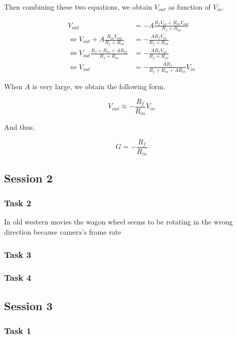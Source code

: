 \documentclass[12pt]{article}
\begin{document}
Then combining these two equations, we obtain $V_{out}$ as function of $V_{in}$.

\begin{align*}
V_{out} &= -A\frac{R_f V_{in} + R_{in} V_{out}}{R_f + R_{in}} \\
\Leftrightarrow V_{out} + A\frac{R_{in} V_{out}}{R_f + R_{in}} &= -\frac{A R_f V_{in}}{R_f + R_{in}} \\
\Leftrightarrow V_{out}\frac{R_f + R_{in} + A R_{in}}{R_f + R_{in}} &= -\frac{A R_f V_{in}}{R_f + R_{in}} \\
\Leftrightarrow V_{out} &= -\frac{A R_f}{R_f + R_{in} + A R_{in}} V_{in}
\end{align*}

When $A$ is very large, we obtain the following form.

\begin{equation*}
V_{out} \approx -\frac{R_f}{R_{in}} V_{in}
\end{equation*}

And thus,

\begin{equation}
G = -\frac{R_f}{R_{in}}
\label{eqn:G}
\end{equation}

\subsection{Session 2}

\subsubsection{Task 2}

In old western movies the wagon wheel seems to be rotating in the wrong direction because camera's frame rate 

\subsubsection{Task 3}

\subsubsection{Task 4}

\subsection{Session 3}

\subsubsection{Task 1}
\end{document}
